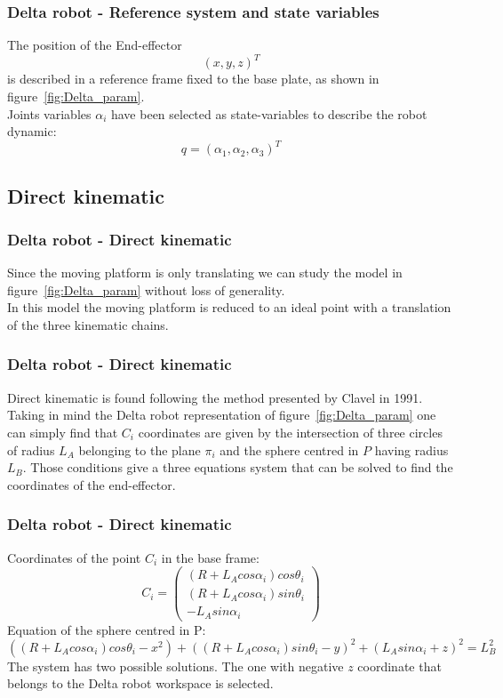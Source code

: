 %
\begin{frame}
\frametitle{Delta robot - Reference system and state variables}
The position of the End-effector
\[
(x,y,z)^T
\]
is described in a reference frame fixed to the base plate, as shown in figure~\ref{fig:Delta_param}.\\
\vspace{.5cm}
Joints variables $\alpha_i$ have been selected as state-variables to describe the robot dynamic:
\[
q = (\alpha_1, \alpha_2, \alpha_3)^T
\]

\end{frame}
%
\subsection{Direct kinematic}
%
\begin{frame}
\frametitle{Delta robot - Direct kinematic}
Since the moving platform is only translating we can study the model in figure~\ref{fig:Delta_param} without loss of generality.\\
In this model the moving platform is reduced to an ideal point with a translation of the three kinematic chains.
\end{frame}
%
\begin{frame}
\frametitle{Delta robot - Direct kinematic}
Direct kinematic is found following the method presented by Clavel in 1991.\\
Taking in mind the Delta robot representation of figure~\ref{fig:Delta_param} one can simply find that $C_i$ coordinates are given by the intersection of three circles of radius $L_A$ belonging to the plane $\pi_i$ and the sphere centred in $P$ having radius $L_B$. Those conditions give a three equations system that can be solved to find the coordinates of the end-effector.
\end{frame}
%
\begin{frame}
\frametitle{Delta robot - Direct kinematic}
%
Coordinates of the point $C_i$ in the base frame:
\begin{equation}
C_i =%
\begin{pmatrix}
	(R + L_Acos\alpha_i)cos\theta_i\\
	(R + L_Acos\alpha_i)sin\theta_i\\
	-L_Asin\alpha_i
\end{pmatrix}
\end{equation}
%
Equation of the sphere centred in P:
%
\small
\begin{equation}
	\left(\left(R + L_Acos\alpha_i\right)cos\theta_i - x^2\right) + \left(\left(R + L_Acos\alpha_i\right)sin\theta_i - y\right)^2 + \left(L_Asin\alpha_i + z\right)^2 = L_B^2
\end{equation}
\normalsize
The system has two possible solutions. The one with negative $z$ coordinate that belongs to the Delta robot workspace is selected.
\end{frame}
